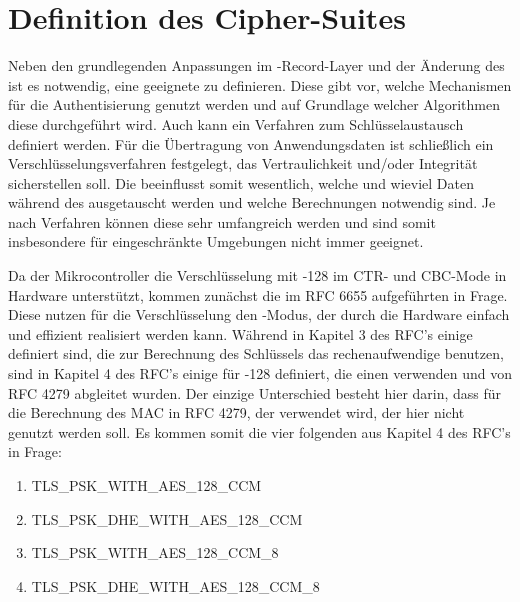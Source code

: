 \chapter{Definition des Cipher-Suites}
\label{chp:ciphercuite}

Neben den grundlegenden Anpassungen im -Record-Layer und der Änderung des  ist es notwendig, eine geeignete  zu definieren.
Diese gibt vor, welche Mechanismen für die Authentisierung genutzt werden und auf Grundlage welcher Algorithmen diese durchgeführt wird. Auch kann
ein Verfahren zum Schlüsselaustausch definiert werden. Für die Übertragung von Anwendungsdaten ist schließlich ein Verschlüsselungsverfahren festgelegt,
das Vertraulichkeit und/oder Integrität sicherstellen soll. Die  beeinflusst somit wesentlich, welche und wieviel Daten während des 
ausgetauscht werden und welche Berechnungen notwendig sind. Je nach Verfahren können diese sehr umfangreich werden und sind somit insbesondere für eingeschränkte
Umgebungen nicht immer geeignet.

Da der Mikrocontroller die Verschlüsselung mit -128 im CTR- und CBC-Mode in Hardware unterstützt, kommen zunächst die im RFC 6655 \cite{rfc6655}
aufgeführten  in Frage. Diese nutzen für die Verschlüsselung den -Modus, der durch die Hardware einfach und effizient realisiert
werden kann. Während in Kapitel 3 des RFC's einige  definiert sind, die zur Berechnung des Schlüssels das rechenaufwendige  benutzen,
sind in Kapitel 4 des RFC's einige  für -128 definiert, die einen  verwenden und von RFC 4279 \cite{rfc4279} abgleitet wurden.
Der einzige Unterschied besteht hier darin, dass für die Berechnung des MAC in RFC 4279, der  verwendet wird, der hier nicht genutzt werden soll. Es kommen
somit die vier folgenden  aus Kapitel 4 des RFC's in Frage:

\begin{enumerate}
  \item TLS\_PSK\_WITH\_AES\_128\_CCM
  \item TLS\_PSK\_DHE\_WITH\_AES\_128\_CCM
  \item TLS\_PSK\_WITH\_AES\_128\_CCM\_8
  \item TLS\_PSK\_DHE\_WITH\_AES\_128\_CCM\_8
\end{enumerate}

